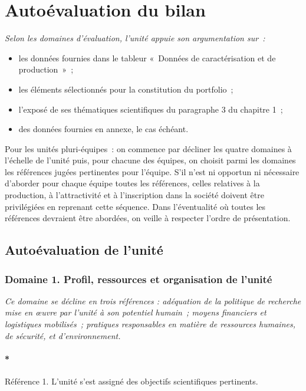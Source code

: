 \documentclass[]{article}
\let\oldparagraph\paragraph
\renewcommand{\paragraph}[1]{\oldparagraph{#1}\mbox{}}
\newcommand{\instructions}[1]{{\em \color{hceresgreen}#1}}
\begin{document}
\section{Autoévaluation du bilan}

\instructions{Selon les domaines d’évaluation, l’unité appuie son argumentation sur :
\begin{itemize}
\item les données fournies dans le tableur « Données de caractérisation et de production » ;
\item les éléments sélectionnés pour la constitution du portfolio ;
\item l’exposé de ses thématiques scientifiques du paragraphe 3 du chapitre 1 ;
\item des données fournies en annexe, le cas échéant.
\end{itemize}

Pour les unités pluri-équipes : on commence par décliner les quatre domaines à l’échelle de l’unité puis, pour chacune des équipes, on choisit parmi les domaines les références jugées pertinentes pour l’équipe. S’il n’est ni opportun ni nécessaire d’aborder pour chaque équipe toutes les références, celles relatives à la production, à l’attractivité et à l’inscription dans la société doivent être privilégiées en reprenant cette séquence.
Dans l’éventualité où toutes les références devraient être abordées, on veille à respecter l’ordre de présentation.
}

\subsection{Autoévaluation de l'unité}

\subsubsection*{Domaine 1. Profil, ressources et organisation de
l'unité}

\instructions{Ce domaine se décline en trois références : adéquation de la politique de recherche mise en œuvre par l’unité à son potentiel humain ; moyens financiers et logistiques mobilisés ; pratiques responsables en matière de ressources humaines, de sécurité, et d’environnement.}

\paragraph*{Référence 1. L'unité s'est assigné des objectifs
scientifiques pertinents.}
\end{document}
